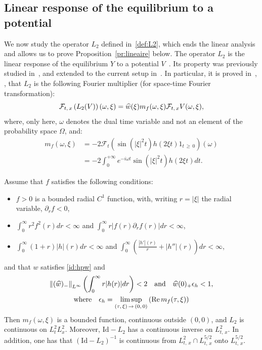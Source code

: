 \documentclass[AHL, Unicode, longabstracts,published]{cedram}
\DeclareMathOperator{\Rel}{Re}
\newcommand{\Id}{\mathrm{Id}}
\newcommand{\mclF}{\mathcal{F}}
\let\oldhat\hat
\renewcommand*{\hat}[1]{\mathchoice{\widehat{#1}}{\widehat{#1}}{\oldhat{#1}}{\oldhat{#1}}}
\begin{document}
\subsection{Linear response of the equilibrium to a potential}

We now study the operator $L_2$ defined in~\eqref{def:L2}, which ends the linear analysis and allows us to prove Proposition~\ref{pr:lineaire} below. The operator $L_2$ is the linear response of the equilibrium $Y$ to a potential $V$~\cite{GV,L,Mih}. Its property was previously studied in~\cite{lewsab2}, and extended to the current setup in~\cite{CodS}. In particular, it is proved in~\cite[Proposition~1]{lewsab2}, \cite[Lemma~5.6]{CodS}, that $L_2$ is the following Fourier multiplier (for space-time Fourier transformation):
\[
\mclF_{t,\,x}\left(L_2(V)\right)(\omega,\xi) = \hat w (\xi)m_f(\omega,\xi) \mclF_{t,\,x} V(\omega,\xi),
\]
where, only here, $\omega$ denotes the dual time variable and not an element of the probability space $\Omega$, and:
\begin{equation} \label{def:mf}
\begin{split}
m_f(\omega,\xi) &= -2\mclF_t \left(\sin\left(|\xi|^2t\right) h(2\xi t)1_{t\,\geq\,0} \right)(\omega)\\
&=-2 \int_0^{+\infty} e^{-i\omega t} \sin \left(|\xi|^2t\right)h(2\xi t) dt.
\end{split}
\end{equation}

\pagebreak

\begin{prop} \label{pr:bdL2}
Assume that $f$ satisfies the following conditions:
\begin{itemize}
\item $f>0$ is a bounded radial $C^1$ function, with, writing $r= |\xi|$ the radial variable, $\partial_r f <0$,
\item $\int_0^\infty r^2f^2(r)dr<\infty$ and $\int_0^\infty r|f(r)\partial_r f(r)|dr < \infty$,
\item $\int_0^\infty (1+r)|h|(r)dr<\infty$ and $\int_0^\infty \left(\frac{|h'|(r)}{r}+|h''|(r)\right)dr<\infty$,
\end{itemize}
and that $w$ satisfies \eqref{id:hpw} and
\begin{multline}\label{def:eph}
\left\| (\hat w)_-\right\|_{L^{\infty}}\left(\int_{0}^{\infty} r|h(r)|dr\right)<2 \quad \text{and} \quad \hat w (0)_+\epsilon_h <1, \\
\text{where} \quad \epsilon_h= \limsup_{(\tau,\,\xi)\,\rightarrow\,(0,\,0)} \left(\Rel m_f(\tau,\xi)\right)
\end{multline}
Then $m_f(\omega,\xi)$ is a bounded function, continuous outside $(0,0)$, and $L_2$ is continuous on $L^2_tL^2_x$. Moreover, $\Id-L_2$ has a continuous inverse on $L^2_{t,\,x}$. In addition, one has that $(\Id-L_2)^{-1}$ is continuous from $L^2_{t,\,x}\cap L^{5/2}_{t,\,x}$ onto $L^{5/2}_{t,\,x}$.
\end{prop}
\end{document}
